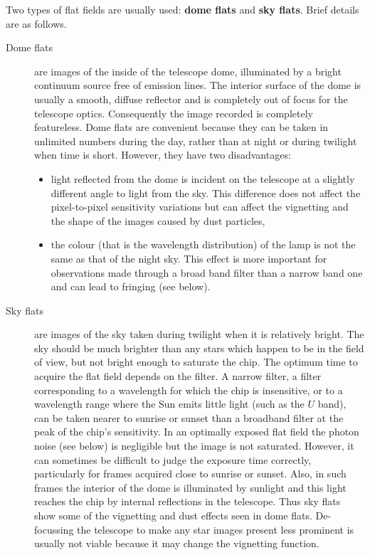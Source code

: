 \documentclass[twoside,11pt]{article}
\begin{document}
Two types of flat fields are usually used: {\bf dome flats} and {\bf
sky flats}.  Brief details are as follows.

\begin{description}

  \item[Dome flats] are images of the inside of the telescope dome,
   illuminated by a bright continuum source free of emission lines.
   The interior surface of the dome is usually a smooth, diffuse
   reflector and is completely out of focus for the telescope optics.
   Consequently the image recorded is completely featureless.  Dome flats are
   convenient because they can be taken in unlimited numbers during the
   day, rather than at night or during twilight when time is short.
   However, they have two disadvantages:

  \begin{itemize}

    \item light reflected from the dome is incident on the telescope at
     a slightly different angle to light from the sky.  This difference
     does not affect the pixel-to-pixel sensitivity variations but can
     affect the vignetting and the shape of the images caused by dust
     particles,

    \item the colour (that is the wavelength distribution) of the lamp
     is not the same as that of the night sky.  This effect is more
     important for observations made through a broad band filter than
     a narrow band one and can lead to fringing (see below).

  \end{itemize}

  \item[Sky flats] are images of the sky taken during twilight when
   it is relatively bright.  The sky should be much brighter than any
   stars which happen to be in the field of view, but not bright enough
   to saturate the chip.  The optimum time to acquire the flat field
   depends on the filter.  A narrow filter, a filter corresponding to a
   wavelength for which the chip is insensitive, or to a wavelength range
   where the Sun emits little light (such as the  $U$ band), can be taken
   nearer to sunrise or sunset than a broadband filter at the peak of the
   chip's sensitivity.  In an optimally exposed flat field the photon
   noise (see below) is negligible but the image is not saturated.
   However, it can sometimes be difficult to judge the exposure time
   correctly, particularly for frames acquired close to sunrise or sunset.
   Also, in such frames the interior of the dome is illuminated by
   sunlight and this light reaches the chip by internal reflections in the
   telescope.  Thus sky flats show some of the vignetting and dust effects
   seen in dome flats.  De-focussing the telescope to make any star images
   present less prominent is usually not viable because it may change
   the vignetting function.


\end{description}
\end{document}
